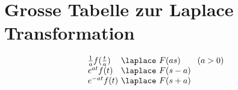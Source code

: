 



\newpage
\section{Grosse Tabelle zur Laplace Transformation}
\[ \begin{array}{l@{ ~ \laplace ~ }l}
\frac{1}{a} f(\frac{t}{a}) &
    F(a s) \qquad (a > 0) \\
e^{a t} f(t) &
    F(s - a) \\
e^{- a t} f(t) & 
    F(s + a) \\
\end{array} \]

